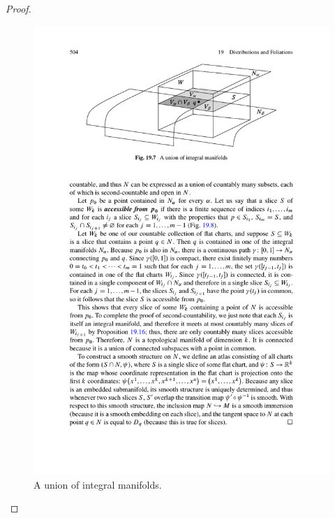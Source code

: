 \begin{proof}
\begin{figure}[htbp]
\includegraphics{pictures/union-integral-submani}
\caption{A union of integral manifolds.}
\end{figure}


\end{proof}
